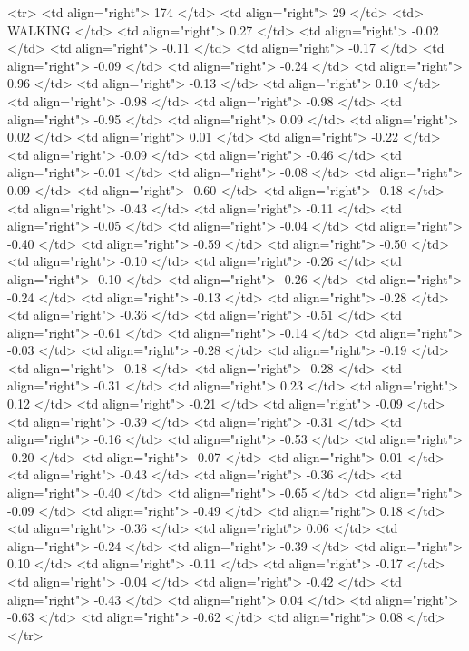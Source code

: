   <tr> <td align="right"> 174 </td> <td align="right">  29 </td> <td> WALKING </td> <td align="right"> 0.27 </td> <td align="right"> -0.02 </td> <td align="right"> -0.11 </td> <td align="right"> -0.17 </td> <td align="right"> -0.09 </td> <td align="right"> -0.24 </td> <td align="right"> 0.96 </td> <td align="right"> -0.13 </td> <td align="right"> 0.10 </td> <td align="right"> -0.98 </td> <td align="right"> -0.98 </td> <td align="right"> -0.95 </td> <td align="right"> 0.09 </td> <td align="right"> 0.02 </td> <td align="right"> 0.01 </td> <td align="right"> -0.22 </td> <td align="right"> -0.09 </td> <td align="right"> -0.46 </td> <td align="right"> -0.01 </td> <td align="right"> -0.08 </td> <td align="right"> 0.09 </td> <td align="right"> -0.60 </td> <td align="right"> -0.18 </td> <td align="right"> -0.43 </td> <td align="right"> -0.11 </td> <td align="right"> -0.05 </td> <td align="right"> -0.04 </td> <td align="right"> -0.40 </td> <td align="right"> -0.59 </td> <td align="right"> -0.50 </td> <td align="right"> -0.10 </td> <td align="right"> -0.26 </td> <td align="right"> -0.10 </td> <td align="right"> -0.26 </td> <td align="right"> -0.24 </td> <td align="right"> -0.13 </td> <td align="right"> -0.28 </td> <td align="right"> -0.36 </td> <td align="right"> -0.51 </td> <td align="right"> -0.61 </td> <td align="right"> -0.14 </td> <td align="right"> -0.03 </td> <td align="right"> -0.28 </td> <td align="right"> -0.19 </td> <td align="right"> -0.18 </td> <td align="right"> -0.28 </td> <td align="right"> -0.31 </td> <td align="right"> 0.23 </td> <td align="right"> 0.12 </td> <td align="right"> -0.21 </td> <td align="right"> -0.09 </td> <td align="right"> -0.39 </td> <td align="right"> -0.31 </td> <td align="right"> -0.16 </td> <td align="right"> -0.53 </td> <td align="right"> -0.20 </td> <td align="right"> -0.07 </td> <td align="right"> 0.01 </td> <td align="right"> -0.43 </td> <td align="right"> -0.36 </td> <td align="right"> -0.40 </td> <td align="right"> -0.65 </td> <td align="right"> -0.09 </td> <td align="right"> -0.49 </td> <td align="right"> 0.18 </td> <td align="right"> -0.36 </td> <td align="right"> 0.06 </td> <td align="right"> -0.24 </td> <td align="right"> -0.39 </td> <td align="right"> 0.10 </td> <td align="right"> -0.11 </td> <td align="right"> -0.17 </td> <td align="right"> -0.04 </td> <td align="right"> -0.42 </td> <td align="right"> -0.43 </td> <td align="right"> 0.04 </td> <td align="right"> -0.63 </td> <td align="right"> -0.62 </td> <td align="right"> 0.08 </td> </tr>
